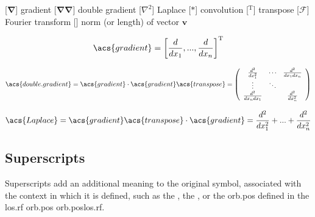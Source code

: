 \begin{acronym}[---------------]
				[${\bm{\nabla}}$]				{gradient}
	[${\bm{\nabla\nabla}}$]	{double gradient}
					[$\nabla^2$]						{Laplace}
								{convolution}
				[$^{\mathrm{T}}$]				{transpose}
					[$\mathscr{F}$]					{Fourier transform}
						[]					{norm (or length) of vector ${\bm{v}}$} %

\ifdefined\IncludeSymbolsText
\begin{changemargin}{\symbolsleftmarginfix}{\symbolsrightmarginfix}

\[
\acs{gradient} = \left[\dfrac{{d}}{{dx_1}}, ..., \dfrac{{d}}{{dx_n}}\right]^\mathrm{T}
\]

\[
\acs{double.gradient} = \acs{gradient} \cdot \acs{gradient}\acs{transpose}
= \left( {\begin{array}{*{20}c}
	{\frac{{d^2}}{{dx_1 ^2 }}} & \cdots & {\frac{{d^2}}{{dx_1 dx_n }}} \\
	\vdots & \ddots & {} \\
	{\frac{{d^2}}{{dx_n dx_1 }}} & {} & {\frac{{d^2}}{{dx_n ^2 }}} \\
\end{array}} \right)
\]

\[
\acs{Laplace} = \acs{gradient}\acs{transpose} \cdot \acs{gradient} = \frac{{d^2}}{{dx_1 ^2 }} + ... + \frac{{d^2}}{{dx_n ^2 }}
\]
\end{changemargin}
\fi

\ifdefined\IncludeSymbolsText
\begin{changemargin}{\symbolsleftmarginfix}{\symbolsrightmarginfix}
\ifdefined\IncludeSymbolsSections
\section{Superscripts}
\label{sec:acro_super}
\else
{}\medskip
\fi

Superscripts add an additional meaning to the original symbol, associated with the context in which it is defined, such as the , the , or the \acl{orb.pos} defined in the \acl{los.rf} \acl{orb.pos} \acs{orb.pos}\acs{los.rf}.


\end{changemargin}
\end{acronym}
